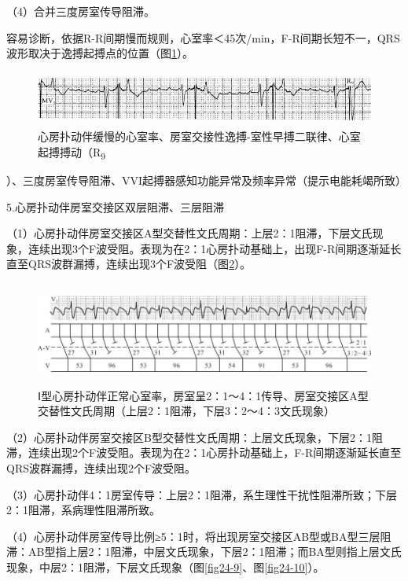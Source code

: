 （4）合并三度房室传导阻滞。

容易诊断，依据R-R间期慢而规则，心室率＜45次/min，F-R间期长短不一，QRS波形取决于逸搏起搏点的位置（图\ref{fig13-11}）。

\begin{figure}[!htbp]
 \centering
 \includegraphics[width=5.58333in,height=0.70833in]{./images/Image00219.jpg}
 \captionsetup{justification=centering}
 \caption{心房扑动伴缓慢的心室率、房室交接性逸搏-室性早搏二联律、心室起搏搏动（R\textsubscript{9}}
 \label{fig13-11}
  \end{figure} 
）、三度房室传导阻滞、VVI起搏器感知功能异常及频率异常（提示电能耗竭所致）

5.心房扑动伴房室交接区双层阻滞、三层阻滞

（1）心房扑动伴房室交接区A型交替性文氏周期：上层2：1阻滞，下层文氏现象，连续出现3个F波受阻。表现为在2：1心房扑动基础上，出现F-R间期逐渐延长直至QRS波群漏搏，连续出现3个F波受阻（图\ref{fig13-12}）。

\begin{figure}[!htbp]
 \centering
 \includegraphics[width=5.875in,height=1.34375in]{./images/Image00220.jpg}
 \captionsetup{justification=centering}
 \caption{Ⅰ型心房扑动伴正常心室率，房室呈2：1～4：1传导、房室交接区A型交替性文氏周期（上层2：1阻滞，下层3：2～4：3文氏现象）}
 \label{fig13-12}
  \end{figure} 

（2）心房扑动伴房室交接区B型交替性文氏周期：上层文氏现象，下层2：1阻滞，连续出现2个F波受阻。表现为在2：1心房扑动基础上，F-R间期逐渐延长直至QRS波群漏搏，连续出现2个F波受阻。

（3）心房扑动伴4：1房室传导：上层2：1阻滞，系生理性干扰性阻滞所致；下层2：1阻滞，系病理性阻滞所致。

（4）心房扑动伴房室传导比例≥5：1时，将出现房室交接区AB型或BA型三层阻滞：AB型指上层2：1阻滞，中层文氏现象，下层2：1阻滞；而BA型则指上层文氏现象，中层2：1阻滞，下层文氏现象（图\ref{fig24-9}、图\ref{fig24-10}）。

